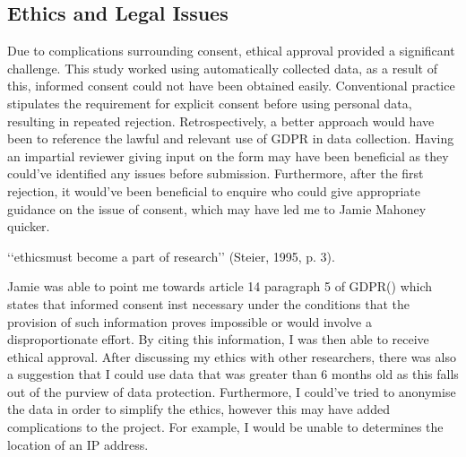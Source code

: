 \subsection{Ethics and Legal Issues}

Due to complications surrounding consent, ethical approval provided a significant challenge. This study worked using automatically collected data, as a result of this, informed consent could not have been obtained easily. Conventional practice stipulates the requirement for explicit consent before using personal data, resulting in repeated rejection. Retrospectively, a better approach would have been to reference the lawful and relevant use of GDPR in data collection. Having an impartial reviewer giving input on the form may have been beneficial as they could've identified any issues before submission. Furthermore, after the first rejection, it would've been beneficial to enquire who could give appropriate guidance on the issue of consent, which may have led me to Jamie Mahoney quicker. 

‘‘ethicsmust become a part of research’’ (Steier, 1995, p. 3).

Jamie was able to point me towards article 14 paragraph 5 of GDPR(\cite{european_commission_regulation_2016}) which states that informed consent inst necessary under the conditions that the provision of such information proves impossible or would involve a disproportionate effort. By citing this information, I was then able to receive ethical approval. After discussing my ethics with other researchers, there was also a suggestion that I could use data that was greater than 6 months old as this falls out of the purview of data protection. Furthermore, I could've tried to anonymise the data in order to simplify the ethics, however this may have added complications to the project. For example, I would be unable to determines the location of an IP address.